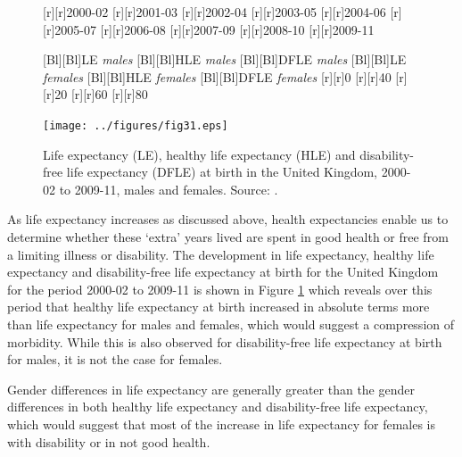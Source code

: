 \documentclass[11 pt, a4paper]{report}
\begin{document}
\begin{figure}[hbtp!]
[r][r]{\small{2000-02}}
[r][r]{\small{2001-03}}
[r][r]{\small{2002-04}}
[r][r]{\small{2003-05}}
[r][r]{\small{2004-06}}
[r][r]{\small{2005-07}}
[r][r]{\small{2006-08}}
[r][r]{\small{2007-09}}
[r][r]{\small{2008-10}}
[r][r]{\small{2009-11}}

[Bl][Bl]{\small{LE \emph{males}}}
[Bl][Bl]{\small{HLE \emph{males}}}
[Bl][Bl]{\small{DFLE \emph{males}}}
[Bl][Bl]{\small{LE \emph{females}}}
[Bl][Bl]{\small{HLE \emph{females}}}
[Bl][Bl]{\small{DFLE \emph{females}}}
[r][r]{\small{0}}
[r][r]{\small{40}}
[r][r]{\small{20}}
[r][r]{\small{60}}
[r][r]{\small{80}}

\texttt{[image: ../figures/fig31.eps]}
\caption{Life expectancy (LE), healthy life expectancy (HLE) and disability-free life expectancy (DFLE) at birth in the United Kingdom, 2000-02 to 2009-11, males and females. Source: \cite{ONS2012}.}
\label{Fig:31}
\end{figure}



As life expectancy increases as discussed above, health expectancies enable us to determine whether these `extra' years lived are spent in good health or free from a limiting illness or disability. The development in life expectancy, healthy life expectancy and disability-free life expectancy at birth for the United Kingdom for the period 2000-02 to 2009-11 is shown in Figure \ref{Fig:31} which reveals over this period that healthy life expectancy at birth increased in absolute terms more than life expectancy for males and females, which would suggest a compression of morbidity. While this is also observed for disability-free life expectancy at birth for males, it is not the case for females.  

Gender differences in life expectancy are generally greater than the gender differences in both healthy life expectancy and disability-free life expectancy, which would suggest that most of the increase in life expectancy for females is with disability or in not good health.  
\end{document}

